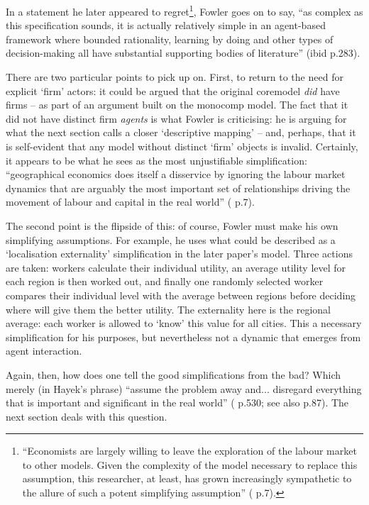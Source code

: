 In a statement he later appeared to regret\footnote{``Economists are largely willing to leave the exploration of the labour market to other models. Given the complexity of the model necessary to replace this assumption, this researcher, at least, has grown increasingly sympathetic to the allure of such a potent simplifying assumption'' (\citealt{fowler_finding_2011} p.7).}, Fowler goes on to say, ``as complex as this specification sounds, it is actually relatively simple in an agent-based framework where bounded rationality, learning by doing and other types of decision-making all have substantial supporting bodies of literature'' (ibid p.283).

There are two particular points to pick up on. First, to return to the need for explicit `firm' actors: it could be argued that the original \gls{coremodel} \emph{did} have firms – as part of an argument built on the \gls{monocomp} model. The fact that it did not have distinct firm \emph{agents} is what Fowler is criticising: he is arguing for what the next section calls a closer `descriptive mapping' – and, perhaps, that it is self-evident that any model without distinct `firm' objects is invalid. Certainly, it appears to be what he sees as the most unjustifiable simplification: ``geographical economics does itself a disservice by ignoring the labour market dynamics that are arguably the most important set of relationships driving the movement of labour and capital in the real world'' (\citealt{fowler_finding_2011} p.7).

The second point is the flipside of this: of course, Fowler must make his own simplifying assumptions. For example, he uses what could be described as a `localisation externality' simplification in the later paper's model. Three actions are taken: workers calculate their individual utility, an average utility level for each region is then worked out, and finally one randomly selected worker compares their individual level with the average between regions before deciding where will give them the better utility. The externality here is the regional average: each worker is allowed to `know' this value for all cities. This a necessary simplification for his purposes, but nevertheless not a dynamic that emerges from agent interaction.

Again, then, how does one tell the good simplifications from the bad? Which merely (in Hayek's phrase) ``assume the problem away and... disregard everything that is important and significant in the real world'' (\citealt{hayek_use_1945} p.530; see also \citealt{miller_complex_2007} p.87). The next section deals with this question.

